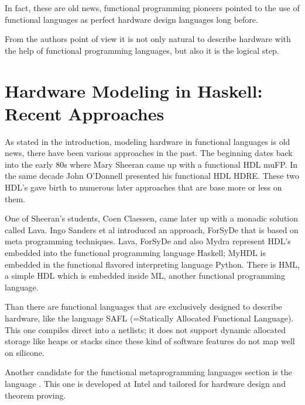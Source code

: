 \documentclass{article}
\begin{document}
\par
In fact, these are old news, functional programming pioneers pointed to the use of functional languages as perfect hardware design languages
long before. \cite{Sheeran} %

\par
From the authors point of view it is not only natural to describe hardware with the help of functional programming languages, but also it is
the logical step.

\section{Hardware Modeling in Haskell: Recent Approaches}
\label{recent_approaches}
As stated in the introduction, modeling hardware in functional languages is old news, there have been various approaches in the past. The
beginning dates back into the early 80s where Mary Sheeran came up with a functional HDL muFP\cite{sheeran:muFP}. In the same decade John
O'Donnell presented his functional HDL HDRE\cite{hydra:old,donnell}. These two HDL's gave birth to numerous later approaches that are base
more or less on them. 

\par
One of Sheeran's students, Coen Claessen, came later up with a monadic solution called Lava\cite{claessen:hardware}. Ingo Sanders et al
introduced an approach, ForSyDe \cite{forsyde:phd,forsyde:ieee} that is based on meta programming techniques. Lava, ForSyDe and also Mydra %
represent HDL's embedded into the functional programming language Haskell; MyHDL \cite{myhdl} is embedded in the functional flavored
interpreting language Python. There is HML\cite{hml}, a simple HDL which is embedded inside ML, another functional programming language. 

\par
Than there are functional languages that are exclusively designed to describe hardware, like the language SAFL (=Statically Allocated
Functional Language)\cite{sharp,sharp:flash,sharp:codesign}. This one compiles direct into a netlists; it does not support dynamic allocated
storage like heaps or stacks since these kind of software features do not map well on silicone. 

\par
Another candidate for the functional metaprogramming languages section is the language  \cite{reflect}. This one is developed at
Intel and tailored for hardware design and theorem proving. 
\end{document}
